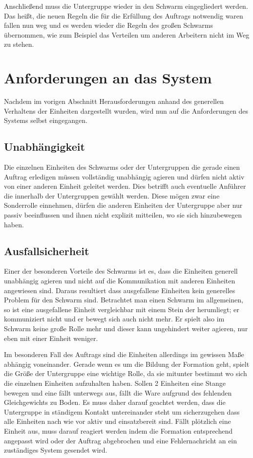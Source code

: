 Anschließend muss die Untergruppe wieder in den Schwarm eingegliedert werden.
Das heißt, die neuen Regeln die für die Erfüllung des Auftrags notwendig waren fallen nun weg und es werden wieder die Regeln des großen Schwarms übernommen, wie zum Beispiel das Verteilen um anderen Arbeitern nicht im Weg zu stehen.

\section{Anforderungen an das System}\label{sec:AnforderungenAnDasSystem}
Nachdem im vorigen Abschnitt Herausforderungen anhand des generellen Verhaltens der Einheiten dargestellt wurden, wird nun auf die Anforderungen des Systems selbst eingegangen.

\subsection*{Unabhängigkeit}
Die einzelnen Einheiten des Schwarms oder der Untergruppen die gerade einen Auftrag erledigen müssen vollständig unabhängig agieren und dürfen nicht aktiv von einer anderen Einheit geleitet werden.
Dies betrifft auch eventuelle Anführer die innerhalb der Untergruppen gewählt werden.
Diese mögen zwar eine Sonderrolle einnehmen, dürfen die anderen Einheiten der Untergruppe aber nur passiv beeinflussen und ihnen nicht explizit mitteilen, wo sie sich hinzubewegen haben.

\subsection*{Ausfallsicherheit}
Einer der besonderen Vorteile des Schwarms ist es, dass die Einheiten generell unabhängig agieren und nicht auf die Kommunikation mit anderen Einheiten angewiesen sind.
Daraus resultiert dass ausgefallene Einheiten kein generelles Problem für den Schwarm sind.
Betrachtet man einen Schwarm im allgemeinen, so ist eine ausgefallene Einheit vergleichbar mit einem Stein der herumliegt; er kommuniziert nicht und er bewegt sich auch nicht mehr.
Er spielt also im Schwarm keine große Rolle mehr und dieser kann ungehindert weiter agieren, nur eben mit einer Einheit weniger.

Im besonderen Fall des Auftrags sind die Einheiten allerdings im gewissen Maße abhängig voneinander.
Gerade wenn es um die Bildung der Formation geht, spielt die Größe der Untergruppe eine wichtige Rolle, da sie mitunter bestimmt wo sich die einzelnen Einheiten aufzuhalten haben.
Sollen 2 Einheiten eine Stange bewegen und eine fällt unterwegs aus, fällt die Ware aufgrund des fehlenden Gleichgewichts zu Boden.
Es muss daher darauf geachtet werden, dass die Untergruppe in ständigem Kontakt untereinander steht um sicherzugehen dass alle Einheiten nach wie vor aktiv und einsatzbereit sind.
Fällt plötzlich eine Einheit aus, muss darauf reagiert werden indem die Formation entsprechend angepasst wird oder der Auftrag abgebrochen und eine Fehlernachricht an ein zuständiges System gesendet wird.

